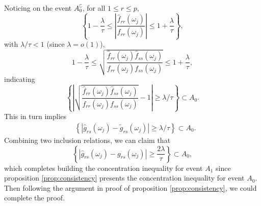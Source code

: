 Noticing on the event $A_0^\complement$, for all $1\le r\le p$, 
\begin{equation}
\left\{1-\frac{\lambda}{\tau}\le \left|\frac{\hat{f}_{rr}(\omega_j)}{f_{rr}(\omega_j)}\right|\le 1+\frac{\lambda}{\tau}\right\}, \nonumber
\end{equation}
with $\lambda/\tau<1$ (since $\lambda = o(1)$), 
\begin{equation}
1-\frac{\lambda}{\tau}\le \sqrt{\frac{\hat{f}_{rr}(\omega_j)\hat{f}_{ss}(\omega_j)}{f_{rr}(\omega_j)f_{ss}(\omega_j)}}\le 1+\frac{\lambda}{\tau}, 
\end{equation}
indicating
\begin{equation}
\left\{\left|\sqrt{\frac{\hat{f}_{rr}(\omega_j)\hat{f}_{ss}(\omega_j)}{f_{rr}(\omega_j)f_{ss}(\omega_j)}}-1\right| \ge \lambda/\tau \right\}\subset A_0. \nonumber
\end{equation}
This in turn implies 
\begin{equation}
\begin{aligned}
&\left\{|\hat{g}_{rs}(\omega_j)-\tilde{g}_{rs}(\omega_j)| \ge \lambda/\tau \right\}\subset A_0. \nonumber
\end{aligned}
\end{equation}
Combining two inclusion relations, we can claim that 
\begin{equation}
\left\{\left|\hat{g}_{rs}(\omega_j)-g_{rs}(\omega_j)\right|\ge \frac{2\lambda}{\tau}\right\}\subset A_0, \nonumber
\end{equation}
which completes building the concentration inequality for event $A_1$ since proposition \ref{prop:consistency} presents the concentration inequality for event $A_0$.  Then following the argument in proof of proposition \ref{prop:consistency}, we could complete the proof. 